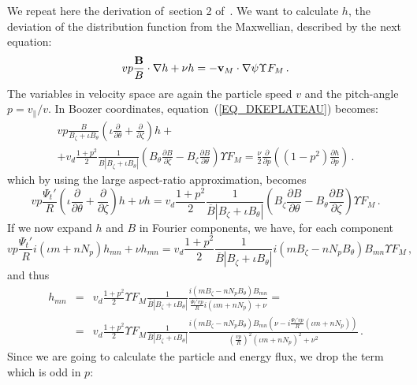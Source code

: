 We repeat here the derivation of~section 2 of~\citep{notes_plateau}. We want to calculate $h$, the deviation of the distribution function from the Maxwellian, described by the next equation:
 \begin{equation}
 vp\frac{\mathbf{B}}{B}\cdot\mathbf{\nabla} h + \nu h = -{\mathbf{v}}_M\cdot\mathbf{\nabla}\psi \Upsilon F_M\,.\label{EQ_DKEPLATEAU}
 \end{equation}
 The variables in velocity space are again the particle speed $v$ and the pitch-angle $p=v_\parallel/v$. In Boozer coordinates,  equation~(\ref{EQ_DKEPLATEAU}) becomes:
\begin{eqnarray}
vp\frac{B}{B_\zeta+\iota B_\theta}\left(\iota\frac{\partial}{\partial \theta}+\frac{\partial}{\partial \zeta}\right) h +\nonumber\\ +v_d\frac{1+p^2}{2}\frac{1}{B|B_\zeta+\iota B_\theta|}\left(B_\theta\frac{\partial B}{\partial \zeta}-B_\zeta\frac{\partial B}{\partial \theta}\right) \Upsilon F_M = \frac{\nu}{2}\frac{\partial}{\partial p}\left((1-p^2)\frac{\partial h}{\partial p}\right)\,.
\end{eqnarray}
 which by using the large aspect-ratio approximation, becomes
 \begin{equation}
 vp\frac{\Psi_t'}{R}\left(\iota\frac{\partial}{\partial \theta} +\frac{\partial}{\partial \zeta}\right) h + \nu h = v_d\frac{1+p^2}{2}\frac{1}{\overline{B}|B_\zeta+\iota B_\theta|}\left(B_\zeta\frac{\partial B}{\partial \theta}-B_\theta\frac{\partial B}{\partial \zeta}\right) \Upsilon F_M\,.
 \end{equation}
 If we now expand $h$ and $B$ in Fourier components, we have, for each component
 \begin{equation}
vp\frac{\Psi_t'}{R}i(\iota m + nN_p) h_{mn} + \nu h_{mn} = v_d\frac{1+p^2}{2}\frac{1}{\overline{B}|B_\zeta+\iota B_\theta|} i(mB_\zeta -nN_pB_\theta)B_{mn}\Upsilon F_M\,,
 \end{equation}
 and thus
 \begin{eqnarray}
 h_{mn} &=& v_d\frac{1+p^2}{2}\Upsilon F_M\frac{1}{\overline{B}|B_\zeta+\iota B_\theta|}\frac{i(mB_\zeta-nN_pB_\theta)B_{mn}}{\frac{\Psi_t'vp}{R}i(\iota m + nN_p)+\nu} = \nonumber \\ &=&  v_d\frac{1+p^2}{2}\Upsilon F_M\frac{1}{\overline{B}|B_\zeta+\iota B_\theta|}\frac{i(mB_\zeta-nN_pB_\theta)B_{mn}\left(\nu-i\frac{\Psi_t'vp}{R}(\iota m + nN_p)\right)}{\left(\frac{vp}{R}\right)^2(\iota m + nN_p)^2+\nu^2}\,.
 \end{eqnarray}
 Since we are going to calculate the particle and energy flux, we drop the term which is odd in $p$:

